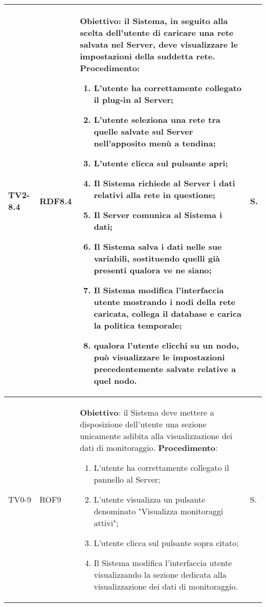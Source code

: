 \begin{longtable}{|C{.15\textwidth}|C{.13\textwidth}|m{.65\textwidth}|C{.08\textwidth}|}
TV2-8.4 & RDF8.4 &
	\textbf{Obiettivo}: il Sistema, in seguito alla scelta dell'utente di caricare una rete salvata nel Server, deve visualizzare le impostazioni della suddetta rete. \newline
	\textbf{Procedimento}:
	\begin{enumerate}
		\item L'utente ha correttamente collegato il plug-in al Server;
		\item L'utente seleziona una rete tra quelle salvate sul Server nell'apposito menù a tendina;
		\item L'utente clicca sul pulsante apri;
		\item Il Sistema richiede al Server i dati relativi alla rete in questione;
		\item Il Server comunica al Sistema i dati;
		\item Il Sistema salva i dati nelle sue variabili, sostituendo quelli già presenti qualora ve ne siano;
		\item Il Sistema modifica l'interfaccia utente mostrando i nodi della rete caricata, collega il database e carica la politica temporale;
		\item qualora l'utente clicchi su un nodo, può visualizzare le impostazioni precedentemente salvate relative a quel nodo.
	\end{enumerate}
	& S. \\
\hline	

TV0-9 & ROF9 &
	\textbf{Obiettivo}: il Sistema deve mettere a disposizione dell'utente una sezione unicamente adibita alla visualizzazione dei dati di monitoraggio. \newline
	\textbf{Procedimento}:
	\begin{enumerate}
		\item L'utente ha correttamente collegato il pannello al Server;
		\item L'utente visualizza un pulsante denominato "Visualizza monitoraggi attivi";
		\item L'utente clicca sul pulsante sopra citato;
		\item Il Sistema modifica l'interfaccia utente visualizzando la sezione dedicata alla visualizzazione dei dati di monitoraggio.
	\end{enumerate}
	& S. \\
\hline	


\end{longtable}
